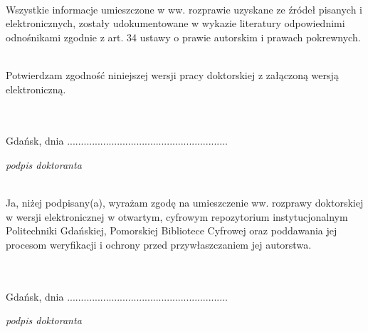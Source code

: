 \begin{myfont}
\noindent
\\
Wszystkie informacje umieszczone w ww. rozprawie uzyskane ze źródeł pisanych 
i elektronicznych, zostały udokumentowane w wykazie literatury odpowiednimi odnośnikami zgodnie z art. 34 ustawy o prawie autorskim i prawach pokrewnych.

\noindent
\\
Potwierdzam zgodność niniejszej wersji pracy doktorskiej z załączoną wersją elektroniczną.

\noindent
\\ \\ 
Gdańsk, dnia .............................\hfill.............................

\scriptsize \noindent
\null\hfill \textit{podpis doktoranta}

\noindent \footnotesize
\\
Ja, niżej podpisany(a), wyrażam zgodę na umieszczenie ww. rozprawy doktorskiej w wersji elektronicznej w otwartym, cyfrowym repozytorium instytucjonalnym Politechniki Gdańskiej, Pomorskiej Bibliotece Cyfrowej oraz poddawania jej procesom weryfikacji i ochrony przed przywłaszczaniem jej autorstwa.

\noindent
\\ \\ 
Gdańsk, dnia .............................\hfill.............................

\scriptsize \noindent
\null\hfill \textit{podpis doktoranta}
\vfill
\end{myfont}

\myemptypage


\begin{figure}
	 \hfill
	
\end{figure}


